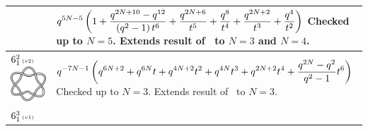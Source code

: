 \documentclass{compositio}
\theoremstyle{definition}
\numberwithin{equation}{section}
\begin{document}
{\begin{longtable}{p{}|p{}}
& 
$
\displaystyle{%
q^{5 N-5} \left(1+\frac{q^{2N+10}-q^{12}}{\left(q^2-1\right) t^6}+\frac{q^{2 N+6}}{t^5}+\frac{q^8}{t^4}+\frac{q^{2 N+2}}{t^3}+\frac{q^4}{t^2}\right)
}
$
\newline\newline\newline\newline
Checked up to $N=5$. Extends result of~\cite{r0508510} to $N=3$ and $N=4$. 
\\
\hline
$6_{1}^2\,\text{{\tiny (v2)}}$ 
\includegraphics[scale=0.07,angle=0]{link6_1_2.pdf} 
& 
$
\displaystyle{%
q^{-7 N-1} \left(q^{6 N+2}+q^{6 N} t+q^{4 N+2} t^2+q^{4 N} t^3+q^{2 N+2} t^4+\frac{q^{2 N} -q^2 }{q^2-1} t^6\right)
}
$
\newline\newline\newline\newline
Checked up to $N=3$. Extends result of~\cite{r0508510} to $N=3$.
\\
\hline
$6_{1}^3\,\text{{\tiny (v1)}}$ 

\end{longtable}}
\end{document}
